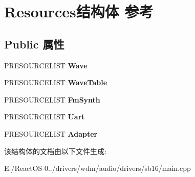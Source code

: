 \hypertarget{struct_resources}{}\section{Resources结构体 参考}
\label{struct_resources}
\subsection*{Public 属性}
\begin{DoxyCompactItemize}
\item 
\mbox{\label{struct_resources_a531e7310745cae05b1af96702a5e9928}} 
P\+R\+E\+S\+O\+U\+R\+C\+E\+L\+I\+ST {\bfseries Wave}
\item 
\mbox{\label{struct_resources_afe2ec2d115c3da20b335947ec93dd851}} 
P\+R\+E\+S\+O\+U\+R\+C\+E\+L\+I\+ST {\bfseries Wave\+Table}
\item 
\mbox{\label{struct_resources_a617f1351614d5a7b9eff191ea774bbd3}} 
P\+R\+E\+S\+O\+U\+R\+C\+E\+L\+I\+ST {\bfseries Fm\+Synth}
\item 
\mbox{\label{struct_resources_ab7c7b225c23c97332fc10278b34d46a8}} 
P\+R\+E\+S\+O\+U\+R\+C\+E\+L\+I\+ST {\bfseries Uart}
\item 
\mbox{\label{struct_resources_a280f714c3eb2ed17b44e0f9afb8389e4}} 
P\+R\+E\+S\+O\+U\+R\+C\+E\+L\+I\+ST {\bfseries Adapter}
\end{DoxyCompactItemize}


该结构体的文档由以下文件生成\+:\begin{DoxyCompactItemize}
\item 
E\+:/\+React\+O\+S-\/0../drivers/wdm/audio/drivers/sb16/main.\+cpp\end{DoxyCompactItemize}
